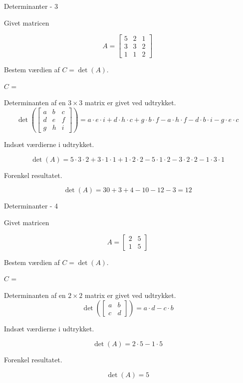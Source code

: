 \documentclass{article}
\begin{document}
\begin{exercise}{Determinanter - 3}

Givet matricen

\[
A = \left[\begin{array}{rrr}
5 & 2 & 1 \\
3 & 3 & 2 \\
1 & 1 & 2
\end{array} \right]
\]

Bestem værdien af $C = \det(A)$.

$C$ = 

\hint
Determinanten af en $3 \times 3$ matrix er givet ved udtrykket.
\[
\det \left( \left[\begin{array}{rrr}
a & b & c \\
d & e & f \\
g & h & i
\end{array} \right] \right) = a \cdot e \cdot i + d \cdot h \cdot c + g \cdot b \cdot f - a \cdot h \cdot f - d \cdot b \cdot i - g \cdot e \cdot c
\]

\hint
Indsæt værdierne i udtrykket.

\hint
\[
\det \left( A \right) = 5 \cdot 3 \cdot 2 + 3 \cdot 1 \cdot 1 + 1 \cdot 2 \cdot 2 - 5 \cdot 1 \cdot 2 - 3 \cdot 2 \cdot 2 - 1 \cdot 3 \cdot 1
\]

\hint
Forenkel resultatet.

\hint
\[
\det \left( A \right) = 30 + 3 + 4 - 10 - 12 - 3 = 12
\]

\end{exercise}


\begin{exercise}{Determinanter - 4}

Givet matricen

\[
A = \left[\begin{array}{rr}
2 & 5 \\
1 & 5
\end{array} \right]
\]

Bestem værdien af $C = \det(A)$.

$C$ = 

\hint
Determinanten af en $2 \times 2$ matrix er givet ved udtrykket.
\[
\det \left( \left[\begin{array}{rr}
a & b \\
c & d
\end{array} \right] \right) = a \cdot d - c \cdot b
\]

\hint
Indsæt værdierne i udtrykket.

\hint
\[
\det \left( A \right) = 2 \cdot 5 - 1 \cdot 5
\]

\hint
Forenkel resultatet.

\hint
\[
\det \left( A \right) = 5
\]

\end{exercise}
\end{document}
